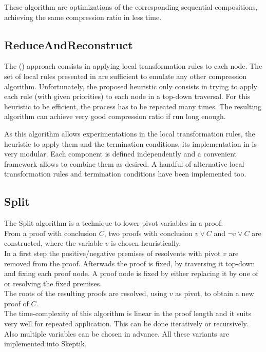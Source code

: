 \documentclass{llncs}
\begin{document}
These algorithm are optimizations of the corresponding sequential compositions, achieving the
same compression ratio in less time. 

\subsection{ReduceAndReconstruct}

The  () approach consists in applying local transformation
rules to each node. The set of local rules presented in \cite{RedRec} are sufficient to emulate any
other compression algorithm. Unfortunately, the proposed heuristic only consists in trying to apply
each rule (with given priorities) to each node in a top-down traversal. For this heuristic to be
efficient, the process has to be repeated many times. The resulting algorithm can achieve very good
compression ratio if run long enough.

As this algorithm allows experimentations in the local transformation rules, the heuristic to apply
them and the termination conditions, its implementation in \skeptik is very modular. Each component
is defined independently and a convenient framework allows to combine them as desired. A handful of
alternative local transformation rules and termination conditions have been implemented too.

\subsection{Split}

The Split \cite{CottonSplit} algorithm is a technique to lower pivot variables in a proof.\\
From a proof with conclusion $C$, two proofs with conclusion $v \vee C$ and $\neg{v} \vee C$ are constructed,  where the variable $v$ is chosen heuristically.\\
In a first step the positive/negative premises of resolvents with pivot $v$ are removed from the proof.
Afterwads the proof is fixed, by traversing it top-down and fixing each proof node.
A proof node is fixed by either replacing it by one of or resolving the fixed premises.\\ %
The roots of the resulting proofs are resolved, using $v$ as pivot, to obtain a new proof of $C$.\\
The time-complexity of this algorithm is linear in the proof length %
and it suits very well for repeated application. This can be done iteratively or recursively. Also multiple variables can be chosen in advance. 
All these variants are implemented into Skeptik.
\end{document}
